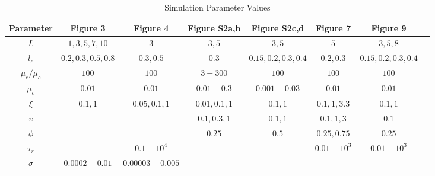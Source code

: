 \documentclass[10pt,letterpaper]{article}
\begin{document}
\begin{table}[h]
\begin{adjustwidth}{-2.25in}{0in}
\centering
\caption{Simulation Parameter Values}
\label{table:para2}
\begin{tabular}{|c|ccccccc|}
	\hline
	Parameter     & \textbf{Figure 3}          & \textbf{Figure 4}       & \textbf{Figure S2a,b}    & \textbf{Figure S2c,d}     & \textbf{Figure 7}    & \textbf{Figure 9}          \\ \hline
	$L$           & $1,3,5,7,10$      & $3$             & $3,5$         & $3,5$                 & $5$         & $3,5,8$            \\ 
	$l_c$         & $0.2,0.3,0.5,0.8$ & $0.3,0.5$       & $0.3$       & $0.15,0.2,0.3,0.4$ & $0.2,0.3$        & $0.15,0.2,0.3,0.4$ \\ 
	$\mu_e/\mu_c$ & $100$             & $100$           & $3-300$     & $100$     & $100$           & $100$              \\ 
	$\mu_c$       & $0.01$            & $0.01$          & $0.01-0.3$  & $0.001-0.03$       & $0.01$      & $0.01$             \\ 
	$\xi$         & $0.1,1$          & $0.05,0.1,1$      & $0.01,0.1,1$  & $0.1,1$  & $0.1,1,3.3$   & $0.1,1$           \\ 
	$\upsilon$    & ~                 & ~               & $0.1,0.3,1$ & $0.1,1$   & $0.1,1,3$    & $0.1$              \\ 
	$\phi$        & ~                 & ~               & $0.25$      & $0.5$     & $0.25,0.75$    & $0.25$             \\ 
	$\tau_r$      & ~                 & $0.1-10^4$      & ~           & ~         & $0.01-10^3$  & $0.01-10^3$              \\ 
	$\sigma$      & $0.0002-0.01$     & $0.00003-0.005$ & ~           & ~         & ~            & ~                          \\
	\hline
\end{tabular}
\end{adjustwidth}
\end{table}
\end{document}
